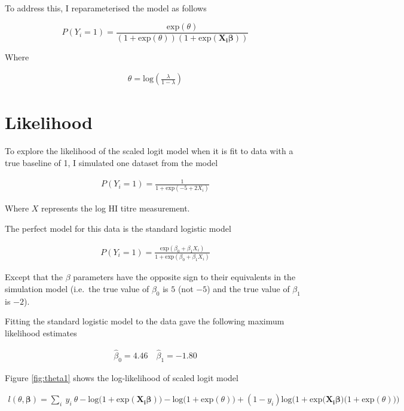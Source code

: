 \documentclass[
]{article}
\begin{document}
To address this, I reparameterised the model as follows

\begin{equation}
  P(Y_i=1)=\frac{\text{exp}(\theta)}{(1 + \text{exp}(\theta))(1 +
\text{exp}(\boldsymbol{X_i}\boldsymbol{\beta}))} 
\end{equation}

Where

\begin{align*}
\theta = \text{log}(\frac{\lambda}{1 - \lambda})
\end{align*}

\pagebreak

\hypertarget{likelihood}{%
\section{Likelihood}\label{likelihood}}

To explore the likelihood of the scaled logit model when it is fit to data with a true baseline of 1, I simulated one dataset from the model

\begin{align*}
  P(Y_i=1)=\frac{1}{1 + \text{exp}(-5 + 2X_i)} 
\end{align*}

Where \(X\) represents the log HI titre measurement.

The perfect model for this data is the standard logistic model

\begin{align*}
  P(Y_i=1)=\frac{\text{exp}(\beta_0 + \beta_1 X_i)}{1 + \text{exp}(\beta_0 + \beta_1 X_i)} 
\end{align*}

Except that the \(\beta\) parameters have the opposite sign to their equivalents in the simulation model (i.e.~the true value of \(\beta_0\) is \(5\) (not \(-5\)) and the true value of \(\beta_1\) is \(-2\)).

Fitting the standard logistic model to the data gave the following maximum likelihood estimates

\begin{align*}
  \hat{\beta}_0 = 4.46 \quad \hat{\beta}_1 = -1.80
\end{align*}

Figure \ref{fig:theta1} shows the log-likelihood of scaled logit model

\begin{align}
l(\theta, \boldsymbol{\beta}) = 
\sum_i \ y_i \ \theta -
\text{log} \big( 1+\text{exp}(\boldsymbol{X_i}\boldsymbol{\beta}) \big) -
\text{log} \big( 1+\text{exp}(\theta) \big) +
(1-y_i)\text{log} 
\Big( 1 + \text{exp} \big( \boldsymbol{X_i}\boldsymbol{\beta} \big) \big( 1 + 
\text{exp}(\theta) \big) \Big)
\end{align}
\end{document}
